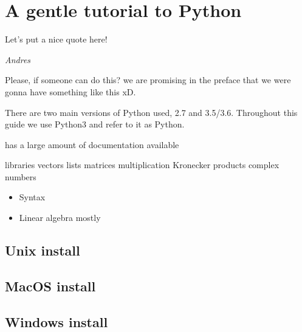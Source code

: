 \chapter{A gentle tutorial to Python}
\label{pythontutorial}

\epigraph{Let's put a nice quote here!}{\textit{Andres}}

Please, if someone can do this? we are promising in the preface that we were gonna have something like this xD.

There are two main versions of Python used, 2.7 and 3.5/3.6. Throughout this guide we use Python3 and refer to it as Python.  

has a large amount of documentation available


libraries
vectors lists
matrices multiplication 
Kronecker products
complex numbers

\begin{itemize}
    \item Syntax
    \item Linear algebra mostly
\end{itemize}

\section{Unix install}


\section{MacOS install}


\section{Windows install}
